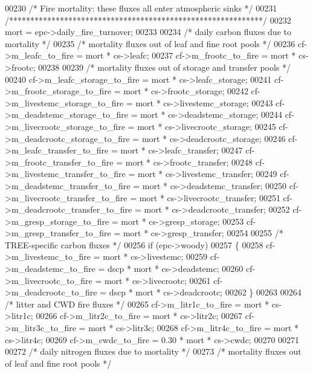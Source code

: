 \begin{DoxyCode}
00230     \textcolor{comment}{/* Fire mortality: these fluxes all enter atmospheric sinks */}
00231     \textcolor{comment}{/************************************************************/}
00232     mort = epc->daily\_fire\_turnover;
00233     
00234     \textcolor{comment}{/* daily carbon fluxes due to mortality */}
00235     \textcolor{comment}{/* mortality fluxes out of leaf and fine root pools */}
00236     cf->m\_leafc\_to\_fire = mort * cs->leafc;      
00237     cf->m\_frootc\_to\_fire = mort * cs->frootc;
00238     
00239     \textcolor{comment}{/* mortality fluxes out of storage and transfer pools */}
00240     cf->m\_leafc\_storage\_to\_fire  = mort * cs->leafc\_storage;
00241     cf->m\_frootc\_storage\_to\_fire  = mort * cs->frootc\_storage;
00242     cf->m\_livestemc\_storage\_to\_fire  = mort * cs->livestemc\_storage;
00243     cf->m\_deadstemc\_storage\_to\_fire  = mort * cs->deadstemc\_storage;
00244     cf->m\_livecrootc\_storage\_to\_fire  = mort * cs->livecrootc\_storage;
00245     cf->m\_deadcrootc\_storage\_to\_fire  = mort * cs->deadcrootc\_storage;
00246     cf->m\_leafc\_transfer\_to\_fire = mort * cs->leafc\_transfer;
00247     cf->m\_frootc\_transfer\_to\_fire = mort * cs->frootc\_transfer;
00248     cf->m\_livestemc\_transfer\_to\_fire = mort * cs->livestemc\_transfer;
00249     cf->m\_deadstemc\_transfer\_to\_fire = mort * cs->deadstemc\_transfer;
00250     cf->m\_livecrootc\_transfer\_to\_fire = mort * cs->livecrootc\_transfer;
00251     cf->m\_deadcrootc\_transfer\_to\_fire = mort * cs->deadcrootc\_transfer;
00252     cf->m\_gresp\_storage\_to\_fire = mort * cs->gresp\_storage;
00253     cf->m\_gresp\_transfer\_to\_fire = mort * cs->gresp\_transfer;
00254 
00255     \textcolor{comment}{/* TREE-specific carbon fluxes */}
00256     \textcolor{keywordflow}{if} (epc->woody)
00257     \{
00258         cf->m\_livestemc\_to\_fire = mort * cs->livestemc;  
00259         cf->m\_deadstemc\_to\_fire = dscp * mort * cs->deadstemc;   
00260         cf->m\_livecrootc\_to\_fire = mort * cs->livecrootc;   
00261         cf->m\_deadcrootc\_to\_fire = dscp * mort * cs->deadcrootc; 
00262     \}
00263     
00264     \textcolor{comment}{/* litter and CWD fire fluxes */}
00265     cf->m\_litr1c\_to\_fire = mort * cs->litr1c;
00266     cf->m\_litr2c\_to\_fire = mort * cs->litr2c;
00267     cf->m\_litr3c\_to\_fire = mort * cs->litr3c;
00268     cf->m\_litr4c\_to\_fire = mort * cs->litr4c;
00269     cf->m\_cwdc\_to\_fire =   0.30 * mort * cs->cwdc;
00270     
00271     
00272     \textcolor{comment}{/* daily nitrogen fluxes due to mortality */}
00273     \textcolor{comment}{/* mortality fluxes out of leaf and fine root pools */}

\end{DoxyCode}
